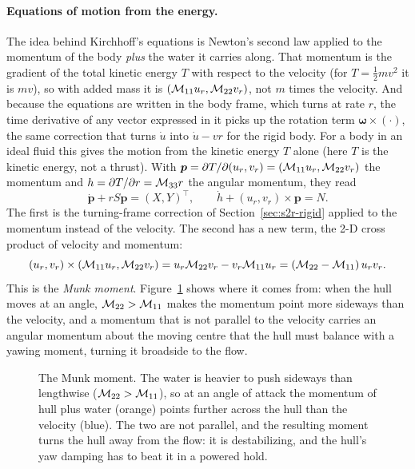 \paragraph{Equations of motion from the energy.} The idea behind Kirchhoff's
equations is Newton's second law applied to the momentum of the body \emph{plus}
the water it carries along. That momentum is the gradient of the total kinetic
energy $T$ with respect to the velocity (for $T = \tfrac12 mv^2$ it is $mv$), so with
added mass it is $(\mathcal{M}_{11}u_r, \mathcal{M}_{22}v_r)$, not $m$ times the velocity. And
because the equations are written in the body frame, which turns at rate $r$, the
time derivative of any vector expressed in it picks up the rotation term
$\bm\omega\times(\cdot)$, the same correction that turns $\dot u$ into $\dot u - vr$
for the rigid body. For a body in an ideal fluid this gives the motion from the
kinetic energy $T$ alone (here $T$ is the kinetic energy, not a thrust). With
$\bm p = \partial T/\partial(u_r, v_r) = (\mathcal{M}_{11}u_r, \mathcal{M}_{22}v_r)$ the momentum
and $h = \partial T/\partial r = \mathcal{M}_{33} r$ the angular momentum, they read
\[
  \dot{\bm p} + r S\bm p = (X, Y)^\top,\qquad
  \dot h + (u_r, v_r)\times\bm p = N .
\]
The first is the turning-frame correction of Section~\ref{sec:s2r-rigid} applied
to the momentum instead of the velocity. The second has a new term, the 2-D cross
product of velocity and momentum:
\[
  (u_r, v_r)\times(\mathcal{M}_{11}u_r, \mathcal{M}_{22}v_r) = u_r\mathcal{M}_{22}v_r - v_r\mathcal{M}_{11}u_r
  = (\mathcal{M}_{22} - \mathcal{M}_{11})\,u_r v_r .
\]
This is the \emph{Munk moment}. Figure~\ref{fig:s2r-munk} shows where it comes
from: when the hull moves at an angle, $\mathcal{M}_{22} > \mathcal{M}_{11}$ makes the momentum
point more sideways than the velocity, and a momentum that is not parallel to the
velocity carries an angular momentum about the moving centre that the hull must
balance with a yawing moment, turning it broadside to the flow.

\begin{figure}[ht]
\centering
{}
\caption{The Munk moment. The water is heavier to push sideways than lengthwise
($\mathcal{M}_{22} > \mathcal{M}_{11}$), so at an angle of attack the momentum of hull plus water
(orange) points further across the hull than the velocity (blue). The two are not
parallel, and the resulting moment turns the hull away from the flow: it is
destabilizing, and the hull's yaw damping has to beat it
in a powered hold.}
\label{fig:s2r-munk}
\end{figure}

